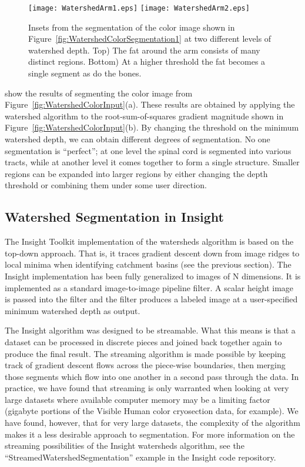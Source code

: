 \begin{figure}
\centering
\texttt{[image: WatershedArm1.eps]}
\texttt{[image: WatershedArm2.eps]}
\caption{
Insets from the segmentation of the color image shown in 
Figure~\protect\ref{fig:WatershedColorSegmentation1} at two different levels of 
watershed depth.  Top) The fat around the arm consists of many 
distinct regions.  Bottom) At a higher threshold the 
fat becomes a single segment as do the bones.
}
\protect\label{fig:WatershedColorSegmentation3}
\end{figure}

show the results of segmenting the color image from
Figure~\ref{fig:WatershedColorInput}(a).  These results are obtained by
applying the watershed algorithm to the root-sum-of-squares gradient magnitude
shown in Figure~\ref{fig:WatershedColorInput}(b).  By changing the threshold on
the minimum watershed depth, we can obtain different degrees of segmentation.
No one segmentation is ``perfect''; at one level the spinal cord is segmented
into various tracts, while at another level it comes together to form a single
structure.  Smaller regions can be expanded into larger regions by either
changing the depth threshold or combining them under some user direction.

\subsection{Watershed Segmentation in Insight}
\label{sec:ImplementationWatersheds}
The Insight Toolkit implementation of the watersheds algorithm is based on the
top-down approach.  That is, it traces gradient descent down from image ridges
to local minima when identifying catchment basins (see the previous
section). The Insight implementation has been fully generalized to images of N
dimensions.  It is implemented as a standard image-to-image pipeline filter.
A scalar height image is passed into the filter and the filter produces a
labeled image at a user-specified minimum watershed depth as output.

The Insight algorithm was designed to be streamable.
What this means is that a dataset can be processed in discrete pieces and
joined back together again to produce the final result.  The streaming
algorithm is made possible by keeping track of gradient descent flows across
the piece-wise boundaries, then merging those segments which flow into one
another in a second pass through the data.  In practice, we have found that
streaming is only warranted when looking at very large datasets where available
computer memory may be a limiting factor (gigabyte portions of the Visible
Human color cryosection data, for example).  We have found, however, that for
very large datasets, the complexity of the algorithm makes it a less desirable
approach to segmentation.  For more information on the streaming possibilities
of the Insight watersheds algorithm, see the ``StreamedWatershedSegmentation''
example in the Insight code repository.

